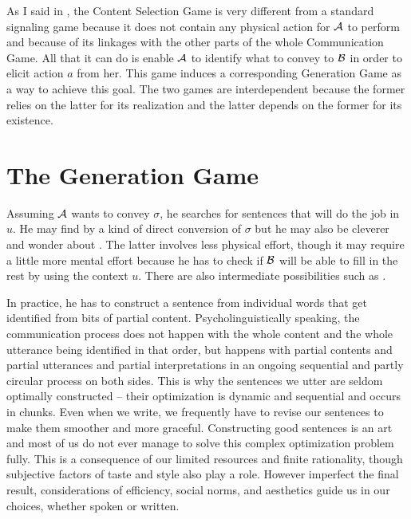 As I said in , the Content Selection Game is very different from a standard signaling game because it does not contain any physical action for $\cal A$ to perform and because of its linkages with the other parts of  the whole Communication Game. All that it can do is enable $\cal A$ to identify what to convey to $\cal B$ in order to elicit action $a$ from her. This game induces a corresponding Generation Game as a way to achieve this goal. The two games are interdependent because the former relies on the latter for its realization and the latter depends on the former for its existence.


\section{The Generation Game} \label{sec:generation game}

Assuming $\cal A$ wants to convey $\sigma$, he searches for sentences that will do the job in $u$. He may find  by a kind of direct conversion of $\sigma$ but he may also be cleverer and wonder about . The latter involves less physical effort, though it may require a little more mental effort because he has to check if $\cal B$ will be able to fill in the rest by using the context $u$. There are also intermediate possibilities such as . 

In practice, he has to construct a sentence from individual words that get identified from bits of partial content. Psycholinguistically speaking, the communication process does not happen with the whole content and the whole utterance being identified in that order, but happens with partial contents and partial utterances and partial interpretations in an ongoing sequential and partly circular process on both sides. This is why the sentences we utter are seldom optimally 
constructed -- their optimization is dynamic and sequential and occurs in chunks. Even when we write, we frequently have to revise our sentences to make them smoother and more graceful. Constructing good sentences is an art and most of us do not ever manage to solve this complex optimization problem fully. This is a consequence of our limited resources and finite rationality, though subjective factors of taste and style also play a role. However imperfect the final result, considerations of efficiency, social norms, and aesthetics guide us in our choices, whether spoken or written.

